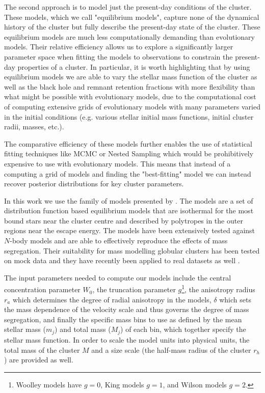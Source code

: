 The second approach is to model just the present-day conditions of the cluster. These models, which
we call "equilibrium models", capture none of the dynamical history of the cluster but fully
describe the present-day state of the cluster. These equilibrium models are much less
computationally demanding than evolutionary models. Their relative efficiency allows us to explore a
significantly larger parameter space when fitting the models to observations to constrain the
present-day properties of a cluster. In particular, it is worth highlighting that by using
equilibrium models we are able to vary the stellar mass function of the cluster as well as the black
hole and remnant retention fractions with more flexibility than what might be possible with
evolutionary models, due to the computational cost of computing extensive grids of evolutionary
models with many parameters varied in the initial conditions (e.g. various stellar initial mass
functions, initial cluster radii, masses, etc.).

The comparative efficiency of these models further enables the use of statistical fitting techniques
like MCMC or Nested Sampling which would be prohibitively expensive to use with evolutionary models.
This means that instead of a computing a grid of models and finding the "best-fitting" model we can
instead recover posterior distributions for key cluster parameters.


In this work we use the  family of models presented by \citet{Gieles2015}. The
 models are a set of distribution function based equilibrium models that are isothermal
for the most bound stars near the cluster centre and described by polytropes in the outer regions
near the escape energy. The models have been extensively tested against $N$-body models
\citep{Zocchi2016, Peuten2017} and are able to effectively reproduce the effects of mass
segregation. Their suitability for mass modelling globular clusters has been tested on mock data
\citep{Henault-Brunet2019} and they have recently been applied to real datasets as well
\citep[e.g.][]{Gieles2018, Henault-Brunet2020}.

The input parameters needed to compute our models include the central concentration parameter $W_0$,
the truncation parameter $g$\footnote{Woolley models \citep{Woolley1954} have $g=0$, King models
\citep{King1966} $g=1$, and Wilson models \citep{Wilson1975} $g=2$.}, the anisotropy radius $r_a$
which determines the degree of radial anisotropy in the models, $\delta$ which sets the mass
dependence of the velocity scale and thus governs the degree of mass segregation, and finally the
specific mass bins to use as defined by the mean stellar mass ($m_j$) and total mass ($M_j$) of each
bin, which together specify the stellar mass function. In order to scale the model units into
physical units, the total mass of the cluster $M$ and a size scale (the half-mass radius of the
cluster $r_h$) are provided as well.



